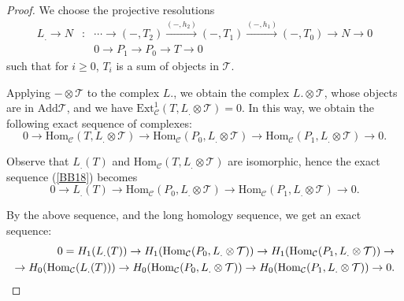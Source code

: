 \documentclass{amsart}
\theoremstyle{plain}
\numberwithin{equation}{section}
\begin{document}
\begin{proof}
We choose the projective resolutions
\begin{eqnarray}
L_{.}\rightarrow N &:&\cdots \rightarrow (-,T_{2})\xrightarrow{(-,h_2)}(-,T_{1})\xrightarrow {(-,h_1)}(-,T_{0})\rightarrow N\rightarrow 0
\label{BB17} \\
&&0\rightarrow P_{1}\rightarrow P_{0}\rightarrow T\rightarrow 0
\end{eqnarray}such that for $i\geq 0$, $T_{i}$ is a sum of objects in $\mathcal{T}$.

Applying $-\otimes \mathcal{T}$ to the complex $L.$, we obtain the complex $L.\otimes \mathcal{T}$, whose objects are in $\mathrm{Add}\mathcal{T}$, and
we have $\mathrm{Ext}_{\mathcal{C}}^{1}(T,L_{.}\otimes \mathcal{T})=0$. In
this way, we obtain the following exact sequence of complexes:
\begin{equation}  \label{BB18}
0\rightarrow \mathrm{Hom}_{\mathcal{C}}(T,L_{.}\otimes \mathcal{T})\rightarrow \mathrm{Hom}_{\mathcal{C}}(P_{0},L_{.}\otimes \mathcal{T})\rightarrow \mathrm{Hom}_{\mathcal{C}}(P_{1},L_{.}\otimes \mathcal{T})\rightarrow 0\text{.}
\end{equation}

Observe that $L_{.}(T)$ and $\mathrm{Hom}_{\mathcal{C}}(T,L_{.}\otimes
\mathcal{T})$ are isomorphic, hence the exact sequence (\ref{BB18}) becomes\begin{equation*}
0\rightarrow L_{.}(T)\rightarrow \mathrm{Hom}_{\mathcal{C}}(P_{0},L_{.}\otimes \mathcal{T})\rightarrow \mathrm{Hom}_{\mathcal{C}}(P_{1},L_{.}\otimes \mathcal{T})\rightarrow 0\text{.}
\end{equation*}

By the above sequence, and the long homology sequence, we get an exact
sequence:
\begin{eqnarray}  \label{BB20}
0 =H_{1}(L_{.}(T))\rightarrow H_{1}(\mathrm{Hom}_{\mathcal{C}}(P_{0},L_{.}\otimes \mathcal{T}))\rightarrow H_{1}(\mathrm{Hom}_{\mathcal{C}}(P_{1},L_{.}\otimes \mathcal{T}))\rightarrow \\
\rightarrow H_{0}(\mathrm{Hom}_{\mathcal{C}}(L_{.}(T)))\rightarrow H_{0}(\mathrm{Hom}_{\mathcal{C}}(P_{0},L_{.}\otimes \mathcal{T}))\rightarrow H_{0}(\mathrm{Hom}_{\mathcal{C}}(P_{1},L_{.}\otimes \mathcal{T}))\rightarrow 0\text{.}  \notag
\end{eqnarray}


\end{proof}
\end{document}
